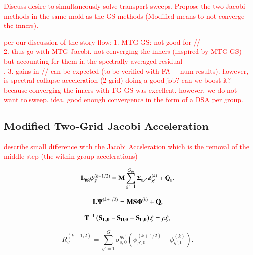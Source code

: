 \documentclass[preprint,10pt]{elsarticle}
\newcommand{\tcr}[1]{\textcolor{red}{#1}}
\begin{document}
\tcr{Discuss desire to simultaneously solve transport sweeps. Propose the two Jacobi methods in the same mold as the GS methods (Modified means to not converge the inners).}

\tcr
{
per our discussion of the story flow:
1. MTG-GS: not good for // \\
2. thus go with MTG-Jacobi. not converging the inners (inspired by MTG-GS) but accounting for them in the spectrally-averaged residual \\. 
3. gains in // can be expected (to be verified with FA + num results). however, is spectral collapse acceleration (2-grid) doing a good job? can we boost it? because converging the inners with TG-GS was excellent. however, we do not want to sweep. idea. good enough convergence in the form of a DSA per group.
}

\subsection{Modified Two-Grid Jacobi Acceleration}

\tcr{describe small difference with the Jacobi Acceleration which is the removal of the middle step (the within-group accelerations)}

\begin{equation}
\label{eq::DSA_WGS_trans_it_eq}
{\bf L_{gg}} \psi_g^{(k+1/2)} =  {\bf M} \sum_{g'=1}^{G_{th}} {\bf \Sigma}_{g g'} \phi_{g'}^{(k)} + {\bf Q}_g .
\end{equation}

\begin{equation}
\label{eq::DSA_WGS_trans_it_eq_ops}
{\bf L} {\bf \Psi}^{(k+1/2)} = {\bf M} {\bf S}  {\bf \Phi}^{(k)} + {\bf Q} ,
\end{equation}

\begin{equation}
\label{eq::DSA_WGS_eigenpprob}
{\bf T}^{-1} \left( {\bf S_{L,0}} + {\bf S_{D,0}}+ {\bf S_{U,0}} \right)\xi = \rho \xi ,
\end{equation}

\begin{equation}
\label{eq::DSA_WGS_diff_residual}
R_g^{(k+1/2)} = \sum_{g'=1}^G \sigma_{s,0}^{g g'} \left( \phi_{g',0}^{(k+1/2)} - \phi_{g',0}^{(k)} \right) .
\end{equation}
\end{document}
